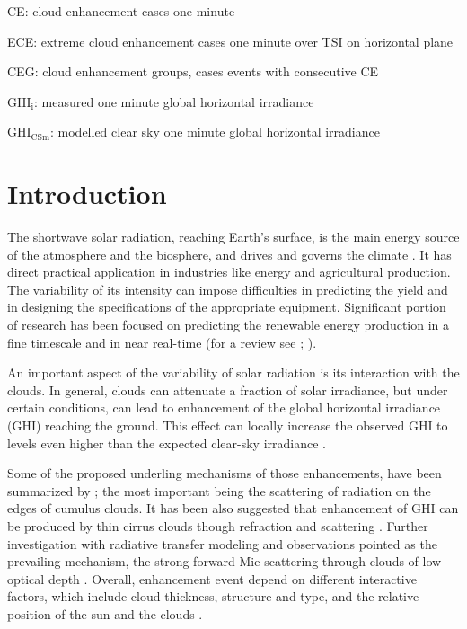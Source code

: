 \documentclass[preprint, 5p,
authoryear]{elsarticle} %
\begin{document}
CE: cloud enhancement cases one minute

ECE: extreme cloud enhancement cases one minute over TSI on horizontal
plane

CEG: cloud enhancement groups, cases events with consecutive CE

\(\text{GHI}_\text{i}\): measured one minute global horizontal
irradiance

\(\text{GHI}_\text{CSm}\): modelled clear sky one minute global
horizontal irradiance

\hypertarget{introduction}{%
\section{Introduction}\label{introduction}}

The shortwave solar radiation, reaching Earth's surface, is the main
energy source of the atmosphere and the biosphere, and drives and
governs the climate \citep{Gray2010}. It has direct practical
application in industries like energy and agricultural production. The
variability of its intensity can impose difficulties in predicting the
yield and in designing the specifications of the appropriate equipment.
Significant portion of research has been focused on predicting the
renewable energy production in a fine timescale and in near real-time
(for a review see \citet{Inman2013}; \citet{Graabak2016}).

An important aspect of the variability of solar radiation is its
interaction with the clouds. In general, clouds can attenuate a fraction
of solar irradiance, but under certain conditions, can lead to
enhancement of the global horizontal irradiance (GHI) reaching the
ground. This effect can locally increase the observed GHI to levels even
higher than the expected clear-sky irradiance \citep[ and references
therein]{Cordero2023, Vamvakas2020, CastillejoCuberos2020, Vamvakas2020}.

Some of the proposed underling mechanisms of those enhancements, have
been summarized by \citet{Gueymard2017}; the most important being the
scattering of radiation on the edges of cumulus clouds. It has been also
suggested that enhancement of GHI can be produced by thin cirrus clouds
though refraction and scattering \citep{Thuillier2013}. Further
investigation with radiative transfer modeling and observations pointed
as the prevailing mechanism, the strong forward Mie scattering through
clouds of low optical depth
\citep{Pecenak2016, Thuillier2013, Yordanov2013, Yordanov2015}. Overall,
enhancement event depend on different interactive factors, which include
cloud thickness, structure and type, and the relative position of the
sun and the clouds \citep{Gueymard2017, Veerman2022}.
\end{document}
